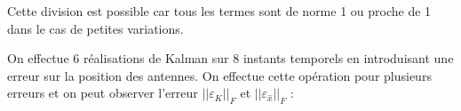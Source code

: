 \documentclass[titlepage]{article}
\newcommand{\fnorm}[1]{|\vert#1|\vert_{F}} %
\begin{document}
	Cette division est possible car tous les termes sont de norme 1 ou proche de 1 dans le cas de petites variations.
	
	On effectue 6 réalisations de Kalman sur 8 instants temporels en introduisant une erreur sur la position des antennes. On effectue cette opération pour plusieurs erreurs et on peut observer l'erreur $\fnorm{\varepsilon_K}$ et $\fnorm{\varepsilon_{\widehat{x}}}$ :
	
	\begin{figure}[H]
		\centering
		\begin{subfigure}{.5\textwidth}
			\centering
			
			\caption{}
		\end{subfigure}%
		\begin{subfigure}{.5\textwidth}
			\centering
			
			\caption{}
		\end{subfigure}
		\caption{}
	\end{figure}
	
\end{document}
